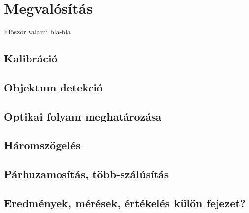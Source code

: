 \chapter{Megvalósítás}

{\color{red} Először valami bla-bla}

\section{Kalibráció}

\section{Objektum detekció}

\section{Optikai folyam meghatározása}

\section{Háromszögelés}

\section{Párhuzamosítás, több-szálúsítás}

\section{Eredmények, mérések, értékelés {\color{red} külön fejezet?}}
